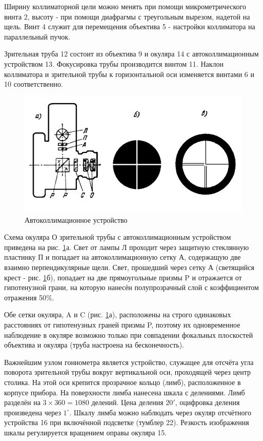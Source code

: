 \documentclass[a4paper, 12pt]{article}%
\begin{document}
Ширину коллиматорной цели можно менять при помощи микрометрического винта 2, высоту - при помощи диафрагмы с треугольным вырезом, надетой на щель. Винт 4 служит для перемещения объектива 5 - настройки коллиматора на параллельный пучок.

Зрительная труба 12 состоит из объектива 9 и окуляра 14 с автоколлимационным устройством 13. Фокусировка трубы производится винтом 11. Наклон коллиматора и зрительной трубы к горизонтальной оси изменяется винтами 6 и 10 соответственно.

\begin{figure}
\includegraphics[scale=0.6]{images/scheme_2.png}
\caption{Автоколлимационное устройство}
\label{fig:scheme_2}
\end{figure}

Схема окуляра О зрительной трубы с автоколлимационным устройством приведена на рис. \ref{fig:scheme_2}а. Свет от лампы Л проходит через защитную стеклянную пластинку П и попадает на автоколлимационную сетку А, содержащую две взаимно перпендикулярные щели. Свет, прошедший через сетку А (светящийся крест - рис. \ref{fig:scheme_2}б), попадает на две прямоугольные призмы P и отражается от гипотенузной грани, на которую нанесён полупрозрачный слой с коэффициентом отражения 50\%.

Обе сетки окуляра, A и C (рис. \ref{fig:scheme_2}а), расположены на строго одинаковых расстояниях от гипотенузных граней призмы P, поэтому их одновременное наблюдение в окуляре возможно только при совпадении фокальных плоскостей объектива и окуляра (труба настроена на бесконечность).

Важнейшим узлом гониометра является устройство, служащее для отсчёта угла поворота зрительной трубы вокруг вертикальной оси, проходящей через центр столика. На этой оси крепится прозрачное кольцо (лимб), расположенное в корпусе прибора. На поверхности лимба нанесена шкала с делениями. Лимб разделён на $3\times 360 = 1080$ делений. Цена деления $20'$, оцифровка деления произведена через $1^{\circ}$. Шкалу лимба можно наблюдать через окуляр отсчётного устройства 16 при включённой подсветке (тумблер 22). Резкость изображения шкалы регулируется вращением оправы окуляра 15.
\end{document}
